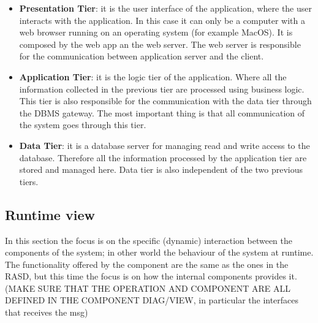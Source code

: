 \begin{itemize}
    \item \textbf{Presentation Tier}: it is the user interface of the application, where the user interacts with the application. 
    In this case it can only be a computer with a web browser running on an operating system (for example MacOS).
    It is composed by the web app an the web server. The web server is responsible for the communication between application server 
    and the client.

    \item \textbf{Application Tier}: it is the logic tier of the application. Where all the information 
    collected in the previous tier are processed using business logic. This tier is also 
    responsible for the communication with the data tier through the DBMS gateway.
    The most important thing is that all communication of the system goes through this tier.

    \item \textbf{Data Tier}: it is a database server for managing read and write access to the database. 
    Therefore all the information processed by the application tier are stored and managed here.
    Data tier is also independent of the two previous tiers. 
\end{itemize}
\subsection{Runtime view}

In this section the focus is on the specific (dynamic) interaction between the components of the system; in other world the behaviour of the system at runtime.
The functionality offered by the component are the same as the ones in the RASD, but this time the focus is on how the internal components provides it.
(MAKE SURE THAT THE OPERATION AND COMPONENT ARE ALL DEFINED IN THE COMPONENT DIAG/VIEW, in particular the interfaces that receives the msg)

